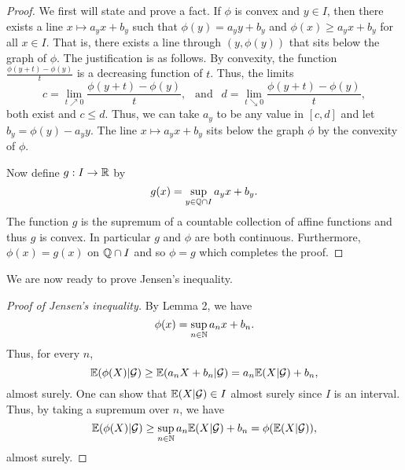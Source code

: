 \begin{proof}
    We first will state and prove a fact. If $\phi$ is convex and $y \in I$, then there exists a line $x \mapsto a_yx+b_y$ such that $\phi(y) = a_yy+b_y$ and $\phi(x) \ge a_y x+b_y$ for all $x \in I$. That is, there exists a line through $(y,\phi(y))$ that sits below the graph of $\phi$. The justification is as follows. By convexity, the function $\frac{\phi(y+t)-\phi(y)}{t}$ is a decreasing function of $t$. Thus, the limits 
    \[c = \lim_{t \nearrow 0} \frac{\phi(y+t)-\phi(y)}{t}, ~~ \text{ and } ~~ d = \lim_{t \searrow 0} \frac{\phi(y+t)-\phi(y)}{t},\]
    both exist and $c \le d$. Thus, we can take $a_y$ to be any value in $[c,d]$ and let $b_y = \phi(y)-a_yy$. The line $x \mapsto a_yx+b_y$ sits below the graph $\phi$ by the convexity of $\phi$. 

    Now define $g:I \to {\mathbb R}$ by
    \[g(x) = \sup_{y \in {\mathbb{Q}} \cap I} a_yx+b_y. \]
    The function $g$ is the supremum of a countable collection of affine functions and thus $g$ is convex. In particular $g$ and $\phi$ are both continuous. Furthermore, $\phi(x)=g(x)$ on ${\mathbb{Q}} \cap I$ and so $\phi = g$ which completes the proof.
\end{proof}
We are now ready to prove Jensen's inequality.
\begin{proof}[Proof of Jensen's inequality]
    By Lemma 2, we have 
    \[\phi(x) = \sup_{n \in {{\mathbb N}}}a_nx+b_n. \]
    Thus, for every $n$,
    \[{\mathbb{E}}(\phi(X)|{\mathcal{G}}) \ge {\mathbb{E}}(a_n X + b_n|{\mathcal{G}}) =a_n{\mathbb{E}}(X|{\mathcal{G}})+b_n, \]
    almost surely. One can show that ${\mathbb{E}}(X|{\mathcal{G}}) \in I$ almost surely since $I$ is an interval. Thus, by taking a supremum over $n$, we have
    \[{\mathbb{E}}(\phi(X)|{\mathcal{G}}) \ge \sup_{n \in {{\mathbb N}}} a_n{\mathbb{E}}(X|{\mathcal{G}})+b_n = \phi({\mathbb{E}}(X|{\mathcal{G}})), \]
    almost surely.
\end{proof}
